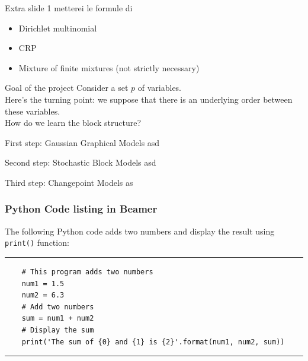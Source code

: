 \begin{frame}{Extra slide 1}
metterei le formule di 
\begin{itemize}
    \item Dirichlet multinomial
    \item CRP
    \item Mixture of finite mixtures (not strictly necessary)

    

\end{itemize} 
\end{frame}




\begin{frame}
    {Goal of the project}
    Consider a set $p$ of variables.\\
    Here's the turning point: we suppose that there is an underlying order between these variables.\\
    How do we learn the block structure?
\end{frame}

\begin{frame}{First step: Gaussian Graphical Models}
    asd
\end{frame}

\begin{frame}{Second step: Stochastic Block Models}
    asd
\end{frame}

\begin{frame}{Third step: Changepoint Models}
    as
\end{frame}


\begin{frame}[fragile]
\frametitle{Python Code listing in Beamer}
The following Python code adds two numbers and display the result using \verb|print()| function:
\rule{\textwidth}{1pt}
\scriptsize
\begin{verbatim}
    # This program adds two numbers
    num1 = 1.5
    num2 = 6.3
    # Add two numbers
    sum = num1 + num2
    # Display the sum
    print('The sum of {0} and {1} is {2}'.format(num1, num2, sum))
\end{verbatim}
\rule{\textwidth}{1pt}
\end{frame}



